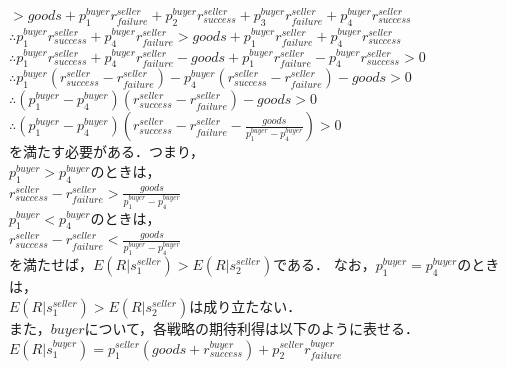 \documentclass[twocolumn, a4j]{article}
\begin{document}
$ > goods + p^{buyer}_1 r^{seller}_{failure} + p^{buyer}_2 r^{seller}_{success} + p^{buyer}_3 r^{seller}_{failure} + p^{buyer}_4 r^{seller}_{success}$ \\

 $\therefore p^{buyer}_1 {r}^{seller}_{success} +  p^{buyer}_4 r^{seller}_{failure} > goods + p^{buyer}_1 r^{seller}_{failure} + p^{buyer}_4 r^{seller}_{success}$ \\

$\therefore p^{buyer}_1 {r}^{seller}_{success} +  p^{buyer}_4 r^{seller}_{failure} - goods + p^{buyer}_1 r^{seller}_{failure} - p^{buyer}_4 r^{seller}_{success} > 0$ \\

$\therefore p^{buyer}_1(r^{seller}_{success} - r^{seller}_{failure}) - p^{buyer}_4(r^{seller}_{success} - r^{seller}_{failure} ) - goods > 0$ \\

$\therefore (p^{buyer}_1 - p^{buyer}_4)(r^{seller}_{success} - r^{seller}_{failure}) - goods> 0$ \\

$\therefore (p^{buyer}_1 - p^{buyer}_4)(r^{seller}_{success} - r^{seller}_{failure} - \frac{ goods }{p^{buyer}_1 - p^{buyer}_4})> 0$ \\
を満たす必要がある．つまり，\\

$ p^{buyer}_1>p^{buyer}_4$のときは， \\

$ r^{seller}_{success} - r^{seller}_{failure} > \frac{ goods }{p^{buyer}_1 - p^{buyer}_4}$\\

$ p^{buyer}_1 < p^{buyer}_4$のときは，\\

$ r^{seller}_{success} - r^{seller}_{failure} < \frac{ goods }{p^{buyer}_1 - p^{buyer}_4}$\\

を満たせば，$E(R |s^{seller}_1) > E(R |s^{seller}_2)$である．
なお，$ p^{buyer}_1 = p^{buyer}_4$のときは，\\

$E(R |s^{seller}_1) > E(R |s^{seller}_2)$は成り立たない．\\

また，$ {buyer}$について，各戦略の期待利得は以下のように表せる．\\

$ E(R|s^{buyer}_1) = p^{seller}_1 (goods + r^{buyer}_{success}) + p^{seller}_2 r^{buyer}_{failure}$ \\
\end{document}
